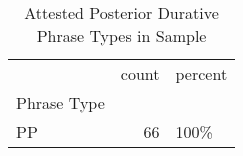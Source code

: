 \begin{table}[htbp!]
\centering
\caption{Attested Posterior Durative Phrase Types in Sample}
\label{table:postdur_phtype_ct}
\begin{tabular}{lrl}
\toprule
{} &  count & percent \\
Phrase Type &        &         \\
\midrule
PP          &     66 &    100\% \\
\bottomrule
\end{tabular}
\end{table}
